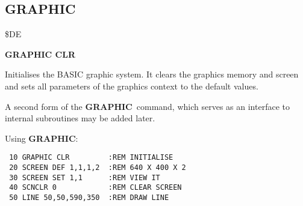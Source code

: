 \subsection{GRAPHIC}
\begin{description}[leftmargin=2cm,style=nextline]
\item [Token:] \$DE
\item [Format:] {\bf GRAPHIC CLR}
\item [Usage:] Initialises the BASIC graphic system.
               It clears the graphics memory and screen and sets
               all parameters of the graphics context to the
               default values.

\item [Remarks:] A second form of the {\bf GRAPHIC} command,
               which serves as an interface to internal
               subroutines may be added later.

\item [Example:] Using {\bf GRAPHIC}:
\begin{tcolorbox}[colback=black,coltext=white]
\verbatimfont{\codefont}
\begin{verbatim}
 10 GRAPHIC CLR         :REM INITIALISE
 20 SCREEN DEF 1,1,1,2  :REM 640 X 400 X 2
 30 SCREEN SET 1,1      :REM VIEW IT
 40 SCNCLR 0            :REM CLEAR SCREEN
 50 LINE 50,50,590,350  :REM DRAW LINE
\end{verbatim}
\end{tcolorbox}
\end{description}


\newpage
